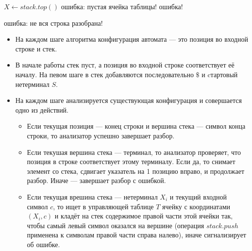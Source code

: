 \documentclass[10pt]{article}         %
\begin{document}
	\begin{algorithm}
		\begin{algorithmic}
			
			\State $X \gets stack.top()$
			\Else
			\State ошибка: пустая ячейка таблицы!
			\EndIf
   			\Else
			\State ошибка!
			\EndIf
			\EndWhile
			
			\State ошибка: не вся строка разобрана!
			\EndIf		
		\end{algorithmic}
		
	\end{algorithm}
	\begin{itemize}
		
	\item На каждом шаге алгоритма конфигурация автомата --- это позиция во входной строке и стек.
	\item В начале работы стек пуст, а позиция во входной строке соответствует её началу.
	На певом шаге в стек добавляются последовательно $\$$ и cтартовый нетерминал $S$.
	\item На каждом шаге анализируется существующая конфигурация и совершается одно из действий.
	\begin{itemize}
		\item Если текущая позиция --- конец строки и вершина стека --- символ конца строки, то анализатор успешно завершает разбор.
		\item Если текушая вершина стека --- терминал, то анализатор проверяет, что позиция в строке соответствует этому терминалу. Если да, то снимает элемент со стека, сдвигает указатель на 1 позицию вправо, и продолжает разбор.
		Иначе --- завершает разбор с ошибкой.
		\item Если текущая врешина стека --- нетерминал $X_i$ и текущий входной символ $c$, то ищет в управляющей таблице $T$ ячейку с координатами $(X_i, c)$ и кладёт на стек содержимое правой части этой ячейки так, чтобы самый левый символ оказался на вершине (операция $stack.push$ применена к символам правой части справа налево), иначе сигнализирует об ошибке.
	\end{itemize}
	\end{itemize}
	
\end{document}
